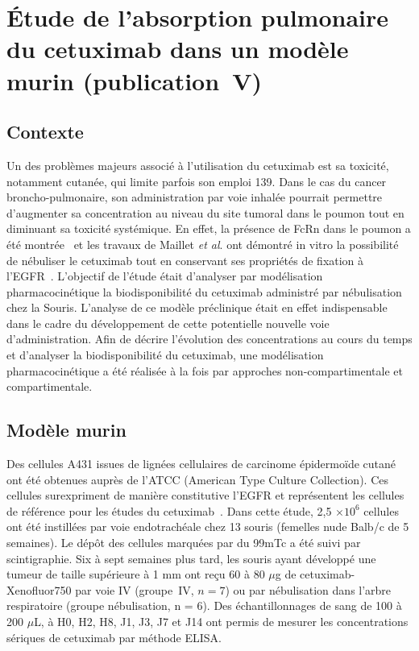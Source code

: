 \section{Étude de l'absorption pulmonaire du cetuximab dans un modèle murin (publication~V)}
\subsection{Contexte}
Un des problèmes majeurs associé à l'utilisation du cetuximab est sa toxicité, notamment cutanée, qui limite parfois son emploi 139. Dans le cas du cancer broncho-pulmonaire, son administration par voie inhalée pourrait permettre d'augmenter sa concentration au niveau du site tumoral dans le poumon tout en diminuant sa toxicité systémique. En effet, la présence de FcRn dans le poumon a été montrée~\citep{REF27} et les travaux de Maillet \textit{et al}. ont démontré in vitro la possibilité de nébuliser le cetuximab tout en conservant ses propriétés de fixation à l'EGFR~\citep{REF140}. L'objectif de l'étude était d'analyser par modélisation pharmacocinétique la biodisponibilité du cetuximab administré par nébulisation chez la Souris. L'analyse de ce modèle préclinique était en effet indispensable dans le cadre du développement de cette potentielle nouvelle voie d'administration. Afin de décrire l'évolution des concentrations au cours du temps et d'analyser la biodisponibilité du cetuximab, une modélisation pharmacocinétique a été réalisée à la fois par approches non-compartimentale et compartimentale. 

\subsection{Modèle murin}
Des cellules A431 issues de lignées cellulaires de carcinome épidermoïde cutané ont été obtenues auprès de l'ATCC (American Type Culture Collection). Ces cellules surexpriment de manière constitutive l'EGFR et représentent les cellules de référence pour les études du cetuximab~\citep{REF141}. Dans cette étude, 2,5 $\times 10^6$ cellules ont été instillées par voie endotrachéale chez 13 souris (femelles nude Balb/c de 5 semaines). Le dépôt des cellules marquées par du 99mTc a été suivi par scintigraphie. Six à sept semaines plus tard, les souris ayant développé une tumeur de taille supérieure à 1 mm ont reçu 60 à 80 $\mu$g de cetuximab-Xenofluor750 par voie IV (groupe~IV, $n = 7$) ou par nébulisation dans l'arbre respiratoire (groupe nébulisation, n = 6). Des échantillonnages de sang de 100 à 200 $\mu$L, à H0, H2, H8, J1, J3, J7 et J14 ont permis de mesurer les concentrations sériques de cetuximab par méthode ELISA.
